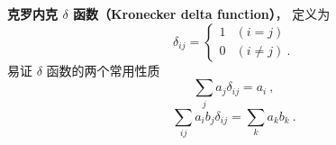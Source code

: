 
\begin{issues}
\end{issues}


\textbf{克罗内克 $\delta$ 函数（Kronecker delta function）}， 定义为
\begin{equation}\label{Kronec_eq2}
\delta_{ij} =
\begin{cases}
1 & (i = j)\\
0 & (i \ne j)~.
\end{cases}
\end{equation}
易证 $\delta$ 函数的两个常用性质
\begin{equation}\label{Kronec_eq1}
\sum_j a_j \delta_{ij} = a_i~,
\end{equation}
\begin{equation}
\sum_{ij} a_i b_j \delta_{ij} = \sum_k a_k b_k~.
\end{equation}
